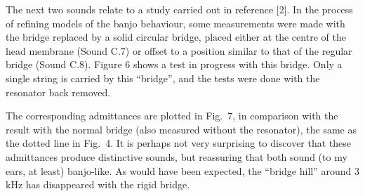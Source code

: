 
  The next two sounds relate to a study carried out in reference [2]. In the 
  process of refining models of the banjo behaviour, some measurements were 
  made with the bridge replaced by a solid circular bridge, placed either at 
  the centre of the head membrane (Sound C.7) or offset to a position similar 
  to that of the regular bridge (Sound C.8). Figure 6 shows a test in progress 
  with this bridge. Only a single string is carried by this ``bridge'', and the 
  tests were done with the resonator back removed. 




  The corresponding admittances are plotted in Fig.\ 7, in comparison with the 
  result with the normal bridge (also measured without the resonator), the same 
  as the dotted line in Fig.\ 4. It is perhaps not very surprising to discover 
  that these admittances produce distinctive sounds, but reassuring that both 
  sound (to my ears, at least) banjo-like. As would have been expected, the 
  ``bridge hill'' around 3 kHz has disappeared with the rigid bridge. 


